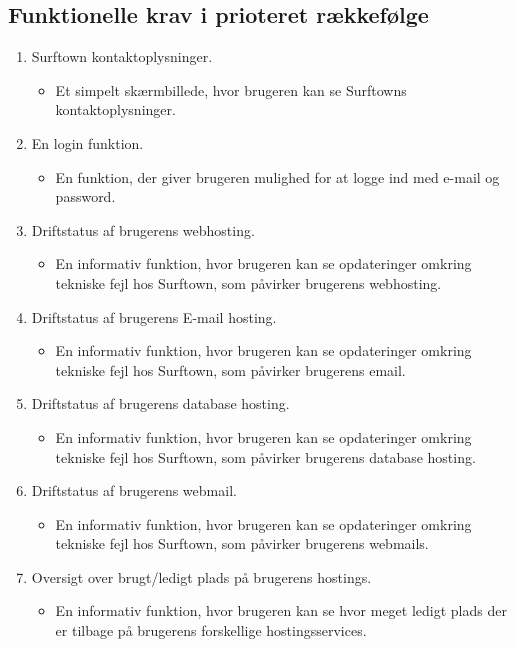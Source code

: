 \documentclass[12pt]{article}
\begin{document}
\subsection*{Funktionelle krav i prioteret rækkefølge}
\label{functionlist}
\begin{enumerate}
  \item{Surftown kontaktoplysninger.}
	\begin{itemize}
		\item{Et simpelt skærmbillede, hvor brugeren kan se Surftowns kontaktoplysninger.}
	\end{itemize}
  \item{En login funktion.}
	\begin{itemize}
		\item{En funktion, der giver brugeren mulighed for at logge ind med e-mail og password.}
	\end{itemize}
  \item{Driftstatus af brugerens webhosting.}
	\begin{itemize}
		\item{En informativ funktion, hvor brugeren kan se opdateringer omkring tekniske fejl hos Surftown, som påvirker brugerens webhosting.}
	\end{itemize}
  \item{Driftstatus af brugerens E-mail hosting.}
	\begin{itemize}
		\item{En informativ funktion, hvor brugeren kan se opdateringer omkring tekniske fejl hos Surftown, som påvirker brugerens email.}
	\end{itemize}
  \item{Driftstatus af brugerens database hosting.}
	\begin{itemize}
		\item{En informativ funktion, hvor brugeren kan se opdateringer omkring tekniske fejl hos Surftown, som påvirker brugerens database hosting.}
	\end{itemize}
  \item{Driftstatus af brugerens webmail.}
	\begin{itemize}
		\item{En informativ funktion, hvor brugeren kan se opdateringer omkring tekniske fejl hos Surftown, som påvirker brugerens webmails.}
	\end{itemize}
  \item{Oversigt over brugt/ledigt plads på brugerens hostings.}
	\begin{itemize}
		\item{En informativ funktion, hvor brugeren kan se hvor meget ledigt plads der er tilbage på brugerens forskellige hostingsservices.}

\end{itemize}
\end{enumerate}
\end{document}
